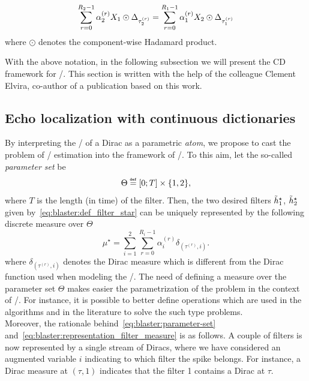 \begin{equation}
    \label{eq:blaster:cross-relation-approx}
    \sum_{r=0}^{R_2-1} \alpha_2^{(r)} X_1 \odot \Delta_{\tau_{2}^{(r)}}
    =
    \sum_{r=0}^{R_1-1} \alpha_1^{(r)} X_2 \odot \Delta_{\tau_{1}^{(r)}}
\end{equation}
where $\odot$ denotes the component-wise Hadamard product.

\mynewline
With the above notation, in the following subsection we will present the \ac{CD} framework for \AER/.
This section is written with the help of the colleague Clement Elvira, co-author of a publication based on this work.

\subsection{Echo localization with continuous dictionaries}
By interpreting the \FT/ of a Dirac as a parametric \textit{atom}, we propose to cast the problem of \RIR/ estimation into the framework of \CD/.
To this aim, let the so-called \emph{parameter set} be
\begin{equation}
    \label{eq:blaster:parameter-set}
    \Theta \eqdef \kintervcc{0}{T} \times \kbrace{1, 2}
    ,
\end{equation}
where $T$ is the length (in time) of the filter.
Then, the two desired filters  $\tilde{h}_1^\star$, $\tilde{h}_2^\star$ given by~\cref{eq:blaster:def_filter_star} can be uniquely represented by the following discrete measure over $\Theta$
\begin{equation}
    \label{eq:blaster:representation_filter_measure}
    \mu^\star = \sum_{i=1}^{2} \sum_{r=0}^{R_{i}-1} \alpha_{i}^{(r)} \delta_{(\tau^{(r)}, i)}.
\end{equation}
where $\delta_{(\tau^{(r)}, i)}$ denotes the Dirac measure which is different from the Dirac function used when modeling the \RIRs/.
The need of defining a measure over the parameter set $\Theta$ makes easier the parametrization of the problem in the context of \CD/.
For instance, it is possible to better define operations which are used in the algorithms and in the literature to solve the such type problems.
\\Moreover, the rationale behind~\cref{eq:blaster:parameter-set} and~\cref{eq:blaster:representation_filter_measure} is as follows.
A couple of filters is now represented by a single stream of Diracs, where we have considered an augmented variable $i$ indicating to which filter the spike belongs.
For instance, a Dirac measure at $(\tau, 1)$ indicates that the filter 1 contains a Dirac at $\tau$.

